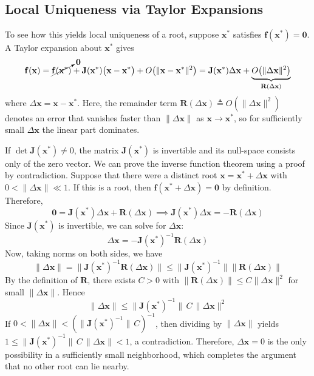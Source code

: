 \subsection{Local Uniqueness via Taylor Expansions}
To see how this yields local uniqueness of a root, suppose \(\mathbf x^*\) satisfies \(\mathbf f(\mathbf x^*)= \mathbf 0\).  A Taylor expansion about \(\mathbf x^*\) gives
\begin{equation}
\mathbf f(\mathbf x)
=\cancelto{\mathbf0}{\mathbf f(\mathbf x^*)}
+\mathbf J(\mathbf x^*)\bigl(\mathbf x-\mathbf x^*\bigr)
+ O\bigl(\|\mathbf x-\mathbf x^*\|^2\bigr)
=\mathbf J(\mathbf x^*) \Delta\mathbf x
+\underbrace{O\bigl(\|\Delta\mathbf x\|^2\bigr)}_{\mathbf{R}(\Delta\mathbf x)}
\end{equation}
where \(\Delta\mathbf x=\mathbf x-\mathbf x^*\).  Here, the remainder term \(\mathbf{R}(\Delta\mathbf x) \triangleq O(\|\Delta\mathbf x\|^2)\) denotes an error that vanishes faster than \(\|\Delta\mathbf x\|\) as \(\mathbf x\to\mathbf x^*\), so for sufficiently small \(\Delta\mathbf x\) the linear part dominates.

If \(\det \mathbf J(\mathbf x^*)\neq 0\), the matrix \(\mathbf J(\mathbf x^*)\) is invertible and its null-space consists only of the zero vector.  We can prove the inverse function theorem using a proof by contradiction. Suppose that there were a distinct root \(\mathbf x=\mathbf x^*+\Delta\mathbf x\) with \(0<\|\Delta\mathbf x\|\ll1\). If this is a root, then \(\mathbf f(\mathbf x^*+\Delta\mathbf x) = \mathbf 0\) by definition. Therefore, %
\begin{equation}
\mathbf{0} = \mathbf J(\mathbf x^*) \Delta\mathbf x + \mathbf{R}(\Delta\mathbf x) \implies
\mathbf J(\mathbf x^*) \Delta\mathbf x = - \mathbf{R}(\Delta\mathbf x)
\end{equation}
Since \(\mathbf J(\mathbf x^*)\) is invertible, we can solve for \(\Delta\mathbf x\):
\[
\Delta\mathbf x = - \mathbf J(\mathbf x^*)^{-1} \mathbf{R}(\Delta\mathbf x)
\]
Now, taking norms on both sides, we have
\[
\|\Delta\mathbf x\|
=\bigl\|\mathbf J(\mathbf x^*)^{-1}\mathbf{R}(\Delta\mathbf x)\bigr\|
\le \bigl\|\mathbf J(\mathbf x^*)^{-1}\bigr\|\bigl\|\mathbf{R}(\Delta\mathbf x)\bigr\|
\]
By the definition of $\mathbf R$, there exists $C>0$ with
$\|\mathbf R(\Delta\mathbf x)\|\le C\|\Delta\mathbf x\|^2$ for small $\|\Delta\mathbf x\|$.
Hence
\[
\|\Delta\mathbf x\|
\le \|\mathbf J(\mathbf x^*)^{-1}\|\,C\,\|\Delta\mathbf x\|^2
\]
If $0<\|\Delta\mathbf x\|<(\|\mathbf J(\mathbf x^*)^{-1}\|\,C)^{-1}$, then dividing by $\|\Delta\mathbf x\|$ yields $1\le \|\mathbf J(\mathbf x^*)^{-1}\|\,C\,\|\Delta\mathbf x\|<1$, a contradiction. Therefore, $\Delta\mathbf x=0$ is the only possibility in a sufficiently small neighborhood, which completes the argument that no other root can lie nearby.

